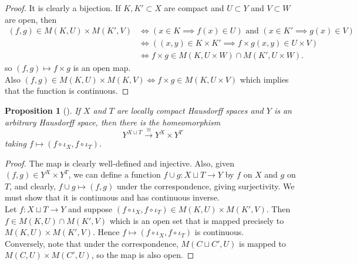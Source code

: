 \documentclass[reqno]{amsart}
\newtheorem{proposition}[theorem]{Proposition}
\theoremstyle{definition}
\theoremstyle{remark}
\begin{document}
\begin{proof}
    It is clearly a bijection.
    If $K, K' \subset X$ are compact
    and $U \subset Y$ and
    $V \subset W$ are open, then
    \begin{align*}
        \left( f,g \right) 
        \in M \left( K,U \right) \times 
        M\left( K',V \right) 
        &\iff \left( x \in K \implies f(x) \in U \right) 
        \text{ and } \left( x \in K' \implies
        g(x) \in V \right) \\
        &\iff \left( (x,y) \in K \times K' \implies
        f \times g(x,y) \in U \times V \right) \\
        &\iff f\times g \in 
        M\left( K , U \times W \right) \cap
        M\left( K', U \times W \right) .
    \end{align*}
    so $\left( f, g \right) \mapsto f \times g$ is an
    open map.\\
    Also $\left( f,g \right) \in 
    M(K, U) \times M(K,V) \iff
    f \times g \in M \left( K, U \times V \right) $ which
    implies that the function is continuous.
\end{proof}

\begin{proposition}[]
    If $X$ and $T$ are locally compact Hausdorff spaces
    and $Y$ is an arbitrary Hausdorff space, then there
    is the homeomorphism
    \[
    Y^{X \sqcup T} \stackrel{\cong}{\to} 
    Y^{X} \times Y^{T}
    \] 
    taking $f \mapsto \left( f \circ \iota_X,
    f \circ \iota_T \right) $.
\end{proposition}

\begin{proof}
    The map is clearly well-defined and
    injective. Also, given $\left( f,g \right) 
    \in Y^{X} \times Y^{T}$, we can
    define a function $f \cup  g\colon
    X \sqcup T \to Y$ by
    $f$ on $X$ and $g$ on $T$, and
    clearly,
    $f \cup g \mapsto (f,g)$ under the correspondence, giving
    surjectivity. We must show that
    it is continuous and has continuous inverse.\\
    Let $f \colon X \sqcup T \to Y$ and
    suppose $\left( 
    f \circ \iota_X , f \circ \iota_T \right) 
    \in M\left( K, U \right) \times 
    M\left( K', V \right)$.
    Then
    $f \in 
    M \left( K, U \right) \cap
    M\left( K', V \right)$ which is an open set
    that is mapped precisely to
    $M \left( K , U \right) \times 
    M \left( K', V \right) $. Hence
    $f\mapsto \left( f \circ \iota_X, f \circ \iota_T \right) $ 
    is continuous.\\

    Conversely, note that
     under the correspondence,
     $M\left( C \sqcup C',U \right) $ is mapped
     to
     $M(C, U) \times M(C',U)$, so
     the map is also open.
\end{proof}
\end{document}
